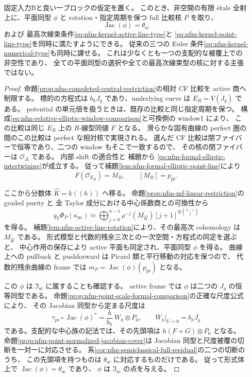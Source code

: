 \begin{proposition}[点の平行移動を指定した核の型の非空性]
\label{prop:nfm-kernel-point-line-nonempty}
固定入力Bと良い一ブロックの仮定を置く。
このとき、非空開の有限 \'etale 全射上に、平面同型 $\phi$ と
rotation・指定周期を保つ full 比較核 $P$ を取り、
\[
 \operatorname{Jac}(\phi)=\theta_{\mathrm{sc}}
\]
および
最高次線束条件\eqref{eq:nfm-kernel-active-line-type}と
\eqref{eq:nfm-kernel-point-line-type}を同時に満たすようにできる。
従来の三つの Euler 条件\eqref{eq:nfm-kernel-numerical-type}も同時に課せる。
これは少なくとも一つの支配的な被覆上での非空性であり、
全ての平面同型の選択や全ての最高次線束型の核に対する主張ではない。
\end{proposition}

\begin{proof}
命題\ref{prop:nfm-completed-central-restriction}の相対 CF 比較を
active 商へ制限する。
標的の方程式は $b_hJ_g$ であり、underlying curve は $E_R=V(J_g)$ である。
potential の単元倍を扱うときは、既存の比較と同じ指定周期を保つ。
構成\eqref{eq:nfm-relative-elliptic-window-comparison}と可換側の window1 により、
この比較は同じ $E_R$ 上の $R$-線型同値 $F$ となる。
滑らかな固有曲線の perfect 圏の間のこの比較は perfect な相対核で実現される。
選んだ CF 比較は閉ファイバーで恒等であり、二つの window もそこで一致するので、
その核の閉ファイバーは $\mathcal O_\Delta$ である。
内部 shift の適合性と
補題から
\eqref{eq:nfm-formal-elliptic-intertwining}が成立する。
従って補題\ref{lem:nfm-formal-elliptic-point-line}により
\[
 F(\mathcal O_{E_R})=M_R,\qquad [M_R]=p_{\mathrm{pt}}.
\]

ここから分数体 $\widehat K=k((h))$ へ移る。
命題\ref{prop:nfm-mf-linear-restriction}の graded purity と
全 Taylor 成分における中心係数商との可換性から
\[
 q_Y\Phi_P(\kappa_{\mathrm{nc}})
 \simeq
 \bigoplus_{j=0}^{n-1}
 \rho^{-j}(M_{\widehat K})[j+1]^{\oplus\binom{n-1}{j}}
\]
を得る。
補題\ref{lem:nfm-active-line-rotation}により、その最高次 cohomology は
$M_{\widehat K}$ である。
形式模型と代数的残余三次との一次空間・方程式の同定を選ぶと、
中心作用の保存により active 平面も同定され、平面同型 $\phi$ を得る。
曲線上への pullback と pushforward は Picard 類と平行移動の対応を保つので、
代数的残余曲線の frame では
$m_P=\operatorname{Jac}(\phi)(p_{\mathrm{pt}})$ となる。

この $\phi$ は $\mathfrak I_{\mathrm{sc}}$ に属することも確認する。
active frame では $\phi$ は二つの $J_g$ の恒等同型である。
命題\ref{prop:nfm-point-scale-formal-comparison}の正確な尺度公式により、
その Jacobian 同型から定まる尺度は
\[
 \tau_{\mathrm{pt}}\circ\operatorname{Jac}(\phi)^*
       =\frac{h}{b_h}\,W_h\otimes P_0,
       \qquad W_h|_{U=0}=b_hJ_g
\]
である。支配的な中心族の記法では、その先頭項は
$h(F+G)\otimes P_0$ となる。
命題\ref{prop:nfm-point-normalized-jacobian-cover}は
Jacobian 同型と尺度被覆の切断を一対一に対応させる。
系\ref{cor:nfm-semiclassical-full-residual}の二つの切断のうち、
この先頭項を持つものは $\theta_{\mathrm{sc}}$ に対応するものだけである。
従って形式体上で
$\operatorname{Jac}(\phi)=\theta_{\mathrm{sc}}$ であり、
$\phi$ は $\mathfrak I_{\mathrm{sc}}$ の点を与える。


\end{proof}

